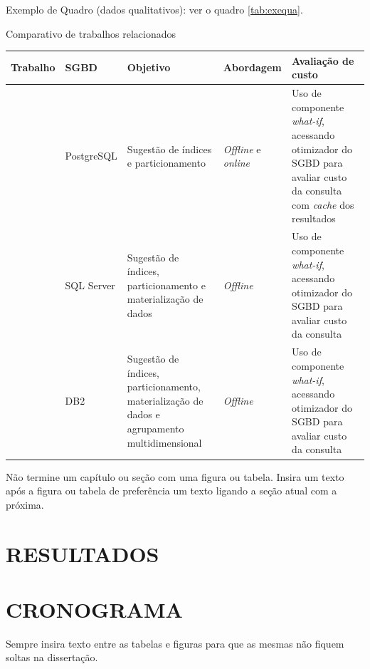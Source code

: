 \documentclass[
    12pt,				       %
    openright,			       %
    oneside,			       %
    a4paper,			       %
    chapter=TITLE,             %
    sumario=tradicional,       %
    english,			        %
    brazil, 				    %
 ]{abntex2}
\begin{document}
Exemplo de Quadro (dados qualitativos): ver o quadro \autoref{tab:exequa}.

\begin{quadro}[!ht]
    \centering
    \caption{Comparativo de trabalhos relacionados}
    \begin{tabular}{|p{2.1cm}|l|p{4.1cm}|p{2.1cm}|p{3.1cm}|} \hline
        \textbf{Trabalho}
        & \textbf{SGBD}
        & \textbf{Objetivo}
        & \textbf{Abordagem}
        & \textbf{Avaliação de custo}
        \\ \hline
        \cite{Alagiannis:2010}
        & PostgreSQL
        & Sugestão de índices e particionamento
        & \emph{Offline} e \emph{online}
        & Uso de componente \emph{what-if}, acessando otimizador do SGBD para avaliar custo da consulta com \emph{cache} dos resultados
        \\ \hline
        \cite{Agrawal:2004}
        & SQL Server
        & Sugestão de índices, particionamento e materialização de dados
        & \emph{Offline}
        & Uso de componente \emph{what-if}, acessando otimizador do SGBD para avaliar custo da consulta
        \\ \hline
        \cite{Zilio:2004}
        & DB2
        & Sugestão de índices, particionamento, materialização de dados e agrupamento multidimensional
        & \emph{Offline}
        & Uso de componente \emph{what-if}, acessando otimizador do SGBD para avaliar custo da consulta
        \\ \hline
    \end{tabular}
    \label{tab:exequa}
\end{quadro}

Não termine um capítulo ou seção com uma figura ou tabela. Insira um texto após a figura ou tabela de preferência um texto ligando a seção atual com a próxima.

\chapter{\MakeUppercase{Resultados}}\label{sec:resultados}


\chapter{\MakeUppercase{Cronograma}}\label{sec:cronograma}
Sempre insira texto entre as tabelas e figuras para que as mesmas não fiquem soltas na dissertação.
\end{document}
